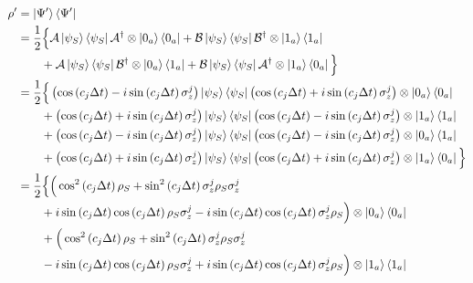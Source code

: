 \documentclass[a4paper,12pt]{article}
\begin{document}
	  \begin{align*}
	  	\rho' &= \ket{\Psi'}\bra{\Psi'} \\ 
	  	& = \frac{1}{2} \Big\{ \mathcal{A} \ket{\psi_S}\bra{\psi_S} \mathcal{A^{\dagger}} \otimes \ket{0_a}\bra{0_a} + \mathcal{B} \ket{\psi_S}\bra{\psi_S} \mathcal{B^{\dagger}} \otimes \ket{1_a}\bra{1_a} \\
	  	& \qquad + \mathcal{A} \ket{\psi_S}\bra{\psi_S} \mathcal{B^{\dagger}} \otimes \ket{0_a}\bra{1_a} +  \mathcal{B} \ket{\psi_S}\bra{\psi_S} \mathcal{A^{\dagger}} \otimes \ket{1_a}\bra{0_a} \Big\} \\
	  	& = \frac{1}{2} \Big\{ \left(\cos{\left( c_j \Delta t \right)} - i \sin{\left( c_j \Delta t \right) \sigma_{z}^{j}}\right)  \ket{\psi_S}\bra{\psi_S} \left( \cos{\left( c_j \Delta t \right)} + i \sin{\left( c_j \Delta t \right) \sigma_{z}^{j}}\right) \otimes \ket{0_a}\bra{0_a} \\
	  	& \qquad + \left(\cos{\left( c_j \Delta t \right)} + i \sin{\left( c_j \Delta t \right) \sigma_{z}^{j}}\right)  \ket{\psi_S}\bra{\psi_S} \left( \cos{\left( c_j \Delta t \right)} - i \sin{\left( c_j \Delta t \right) \sigma_{z}^{j}}\right) \otimes \ket{1_a}\bra{1_a} \\
	  	& \qquad + \left(\cos{\left( c_j \Delta t \right)} - i \sin{\left( c_j \Delta t \right) \sigma_{z}^{j}}\right)  \ket{\psi_S}\bra{\psi_S} \left( \cos{\left( c_j \Delta t \right)} - i \sin{\left( c_j \Delta t \right) \sigma_{z}^{j}}\right) \otimes \ket{0_a}\bra{1_a} \\
	  	& \qquad + \left(\cos{\left( c_j \Delta t \right)} + i \sin{\left( c_j \Delta t \right) \sigma_{z}^{j}}\right)  \ket{\psi_S}\bra{\psi_S} \left( \cos{\left( c_j \Delta t \right)} + i \sin{\left( c_j \Delta t \right) \sigma_{z}^{j}}\right) \otimes \ket{1_a}\bra{0_a} \Big\} \\
	  	& = \frac{1}{2} \Big\{ \Big( \cos^{2}{\left( c_j \Delta t \right)} \, \rho_S + \sin^{2}{\left( c_j \Delta t \right)} \, \sigma_{z}^{j}\rho_S\sigma_{z}^{j} \\
	  	& \qquad +i \sin{\left( c_j \Delta t \right)}\cos{\left( c_j \Delta t \right)} \, \rho_S \sigma_{z}^{j} - i \sin{\left( c_j \Delta t \right)}\cos{\left( c_j \Delta t \right)} \, \sigma_{z}^{j} \rho_S \Big) \otimes \ket{0_a}\bra{0_a} \\
	  	& \qquad  + \Big( \cos^{2}{\left( c_j \Delta t \right)} \, \rho_S + \sin^{2}{\left( c_j \Delta t \right)} \, \sigma_{z}^{j}\rho_S\sigma_{z}^{j} \\
	  	& \qquad - i \sin{\left( c_j \Delta t \right)}\cos{\left( c_j \Delta t \right)} \, \rho_S \sigma_{z}^{j} + i \sin{\left( c_j \Delta t \right)}\cos{\left( c_j \Delta t \right)} \, \sigma_{z}^{j} \rho_S \Big) \otimes \ket{1_a}\bra{1_a} \\

\end{align*}
\end{document}
